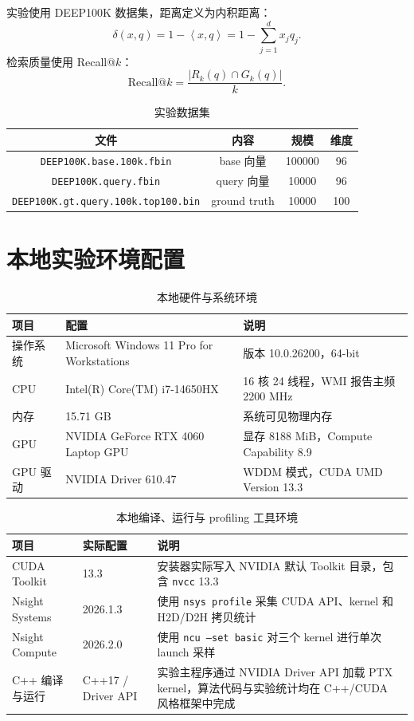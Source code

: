 \documentclass[a4paper]{article}
\newcommand{\ip}[2]{\left\langle #1,#2 \right\rangle}
\begin{document}
实验使用 DEEP100K 数据集，距离定义为内积距离：
\[
  \delta(x,q)=1-\ip{x}{q}=1-\sum_{j=1}^{d}x_j q_j .
\]
检索质量使用 Recall@$k$：
\[
  \mathrm{Recall@}k=\frac{|R_k(q)\cap G_k(q)|}{k}.
\]

\begin{table}[H]
\centering
\caption{实验数据集}
\label{tab:dataset}
\begin{tabular}{cccc}
\toprule
文件 & 内容 & 规模 & 维度 \\
\midrule
\texttt{DEEP100K.base.100k.fbin} & base 向量 & 100000 & 96 \\
\texttt{DEEP100K.query.fbin} & query 向量 & 10000 & 96 \\
\texttt{DEEP100K.gt.query.100k.top100.bin} & ground truth & 10000 & 100 \\
\bottomrule
\end{tabular}
\end{table}


\section{本地实验环境配置}


\begin{table}[H]
\centering
\caption{本地硬件与系统环境}

\begin{tabularx}{\textwidth}{lll}
\toprule
项目 & 配置 & 说明 \\
\midrule
操作系统 & Microsoft Windows 11 Pro for Workstations & 版本 10.0.26200，64-bit \\
CPU & Intel(R) Core(TM) i7-14650HX & 16 核 24 线程，WMI 报告主频 2200 MHz \\
内存 & 15.71 GB & 系统可见物理内存 \\
GPU & NVIDIA GeForce RTX 4060 Laptop GPU & 显存 8188 MiB，Compute Capability 8.9 \\
GPU 驱动 & NVIDIA Driver 610.47 & WDDM 模式，CUDA UMD Version 13.3 \\
\bottomrule
\end{tabularx}
\end{table}

\begin{table}[H]
\centering
\small
\caption{本地编译、运行与 profiling 工具环境}
\label{tab:local-env-tools}
\begin{tabularx}{\textwidth}{llX}
\toprule
项目 & 实际配置 & 说明 \\
\midrule
CUDA Toolkit & 13.3 & 安装器实际写入 NVIDIA 默认 Toolkit 目录，包含 \texttt{nvcc} 13.3 \\
Nsight Systems & 2026.1.3 & 使用 \texttt{nsys profile} 采集 CUDA API、kernel 和 H2D/D2H 拷贝统计 \\
Nsight Compute & 2026.2.0 & 使用 \texttt{ncu --set basic} 对三个 kernel 进行单次 launch 采样 \\
C++ 编译与运行 & C++17 / Driver API & 实验主程序通过 NVIDIA Driver API 加载 PTX kernel，算法代码与实验统计均在 C++/CUDA 风格框架中完成 \\
\bottomrule
\end{tabularx}
\end{table}
\end{document}
